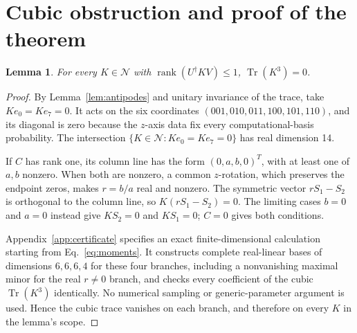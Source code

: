 \documentclass[aps,pra,reprint,onecolumn,superscriptaddress]{revtex4-2}
\newcommand{\NN}{\mathcal N}
\newcommand{\Tr}{\operatorname{Tr}}
\newcommand{\rank}{\operatorname{rank}}
\newtheorem{lemma}{Lemma}
\begin{document}
\section{Cubic obstruction and proof of the theorem}

\begin{lemma}\label{lem:cubic}
For every \(K\in\NN\) with \(\rank(U^\dagger K V)\le1\), \(\Tr(K^3)=0\).
\end{lemma}
\begin{proof}
By Lemma~\ref{lem:antipodes} and unitary invariance of the trace, take \(K e_0=K e_7=0\). It acts on the six coordinates \((001,010,011,100,101,110)\), and its diagonal is zero because the \(z\)-axis data fix every computational-basis probability. The intersection \(\{K\in\NN:K e_0=K e_7=0\}\) has real dimension 14.

If \(C\) has rank one, its column line has the form \((0,a,b,0)^T\), with at least one of \(a,b\) nonzero. When both are nonzero, a common \(z\)-rotation, which preserves the endpoint zeros, makes \(r=b/a\) real and nonzero. The symmetric vector \(rS_1-S_2\) is orthogonal to the column line, so \(K(rS_1-S_2)=0\). The limiting cases \(b=0\) and \(a=0\) instead give \(KS_2=0\) and \(KS_1=0\); \(C=0\) gives both conditions.

Appendix~\ref{app:certificate} specifies an exact finite-dimensional calculation starting from Eq.~\eqref{eq:moments}. It constructs complete real-linear bases of dimensions \(6,6,6,4\) for these four branches, including a nonvanishing maximal minor for the real \(r\ne0\) branch, and checks every coefficient of the cubic \(\Tr(K^3)\) identically. No numerical sampling or generic-parameter argument is used. Hence the cubic trace vanishes on each branch, and therefore on every \(K\) in the lemma's scope.
\end{proof}
\end{document}
